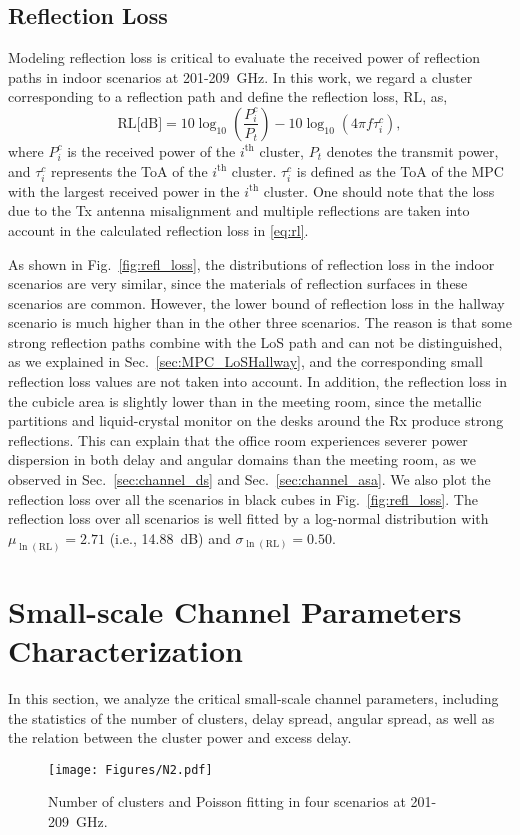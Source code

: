 \documentclass[journal,12pt,draftclsnofoot,onecolumn]{IEEEtran}
\begin{document}
\subsection{Reflection Loss}
\label{sec:reflection-loss}
Modeling reflection loss is critical to evaluate the received power of reflection paths in indoor scenarios at 201-209~GHz. In this work, we regard a cluster corresponding to a reflection path and define the reflection loss, $\text{RL}$, as,
\begin{equation}\label{eq:rl}
    \text{RL} \text{[dB]}=10\log_{10}(\frac{P_i^c}{ P_t})-10\log_{10}{(4\pi f\tau_i^c)},
\end{equation}
where $P_i^c$ is the received power of the $i^{\text{th}}$ cluster, $P_t$ denotes the transmit power, and $\tau^c_i$ represents the ToA of the $i^{\text{th}}$ cluster. $\tau_i^c $ is defined as the ToA of the MPC with the largest received power in the $i^{\text{th}}$ cluster. One should note that the loss due to the Tx antenna misalignment and multiple reflections are taken into account in the calculated reflection loss in \eqref{eq:rl}.
\par As shown in Fig.~\ref{fig:refl_loss}, the distributions of reflection loss in the indoor scenarios are very similar, since the materials of reflection surfaces in these scenarios are common. However, the lower bound of reflection loss in the hallway scenario is much higher than in the other three scenarios. The reason is that some strong reflection paths combine with the LoS path and can not be distinguished, as we explained in Sec.~\ref{sec:MPC_LoSHallway}, and the corresponding small reflection loss values are not taken into account. In addition, the reflection loss in the cubicle area is slightly lower than in the meeting room, since the metallic partitions and liquid-crystal monitor on the desks around the Rx produce strong reflections. This can explain that the office room experiences severer power dispersion in both delay and angular domains than the meeting room, as we observed in Sec.~\ref{sec:channel_ds} and Sec.~\ref{sec:channel_asa}. We also plot the reflection loss over all the scenarios in black cubes in Fig.~\ref{fig:refl_loss}. The reflection loss over all scenarios is well fitted by a log-normal distribution with $\mu_{\ln(\text{RL})}=2.71$ (i.e., 14.88~dB) and $\sigma_{\ln(\text{RL})}=0.50$.


\section{Small-scale Channel Parameters Characterization} \label{Sec:ChannelParameterCharacterizations}
In this section, we analyze the critical small-scale channel parameters, including the statistics of the number of clusters, delay spread, angular spread, as well as the relation between the cluster power and excess delay.
\begin{figure}
\centering
\texttt{[image: Figures/N2.pdf]}
\caption{Number of clusters and Poisson fitting in four scenarios at 201-209~GHz.}
\label{fig:N}
\end{figure}
\end{document}

